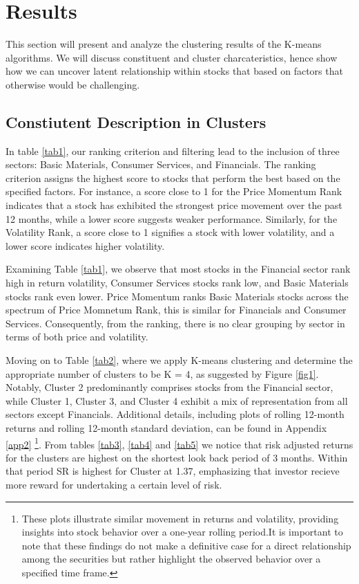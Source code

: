 \documentclass[11pt,preprint, authoryear]{elsarticle}
\numberwithin{equation}{section}
\numberwithin{figure}{section}
\numberwithin{table}{section}
\let\rmarkdownfootnote\footnote%
\def\footnote{\protect\rmarkdownfootnote}
\begin{document}
\hypertarget{results}{%
\section{\texorpdfstring{Results
\label{Results}}{Results }}\label{results}}

This section will present and analyze the clustering results of the
K-means algorithms. We will discuss constituent and cluster
charcateristics, hence show how we can uncover latent relationship
within stocks that based on factors that otherwise would be challenging.

\hypertarget{constiutent-description-in-clusters}{%
\subsection{Constiutent Description in
Clusters}\label{constiutent-description-in-clusters}}

In table \ref{tab1}, our ranking criterion and filtering lead to the
inclusion of three sectors: Basic Materials, Consumer Services, and
Financials. The ranking criterion assigns the highest score to stocks
that perform the best based on the specified factors. For instance, a
score close to 1 for the Price Momentum Rank indicates that a stock has
exhibited the strongest price movement over the past 12 months, while a
lower score suggests weaker performance. Similarly, for the Volatility
Rank, a score close to 1 signifies a stock with lower volatility, and a
lower score indicates higher volatility.

Examining Table \ref{tab1}, we observe that most stocks in the Financial
sector rank high in return volatility, Consumer Services stocks rank
low, and Basic Materials stocks rank even lower. Price Momentum ranks
Basic Materials stocks across the spectrum of Price Momnetum Rank, this
is similar for Financials and Consumer Services. Consequently, from the
ranking, there is no clear grouping by sector in terms of both price and
volatility.

Moving on to Table \ref{tab2}, where we apply K-means clustering and
determine the appropriate number of clusters to be K = 4, as suggested
by Figure \ref{fig1}. Notably, Cluster 2 predominantly comprises stocks
from the Financial sector, while Cluster 1, Cluster 3, and Cluster 4
exhibit a mix of representation from all sectors except Financials.
Additional details, including plots of rolling 12-month returns and
rolling 12-month standard deviation, can be found in Appendix \ref{app2}
\footnote{These plots illustrate similar movement in returns and
  volatility, providing insights into stock behavior over a one-year
  rolling period.It is important to note that these findings do not make
  a definitive case for a direct relationship among the securities but
  rather highlight the observed behavior over a specified time frame.}.
From tables \ref{tab3}, \ref{tab4} and \ref{tab5} we notice that risk
adjusted returns for the clusters are highest on the shortest look back
period of 3 months. Within that period SR is highest for Cluster at
1.37, emphasizing that investor recieve more reward for undertaking a
certain level of risk.
\end{document}
